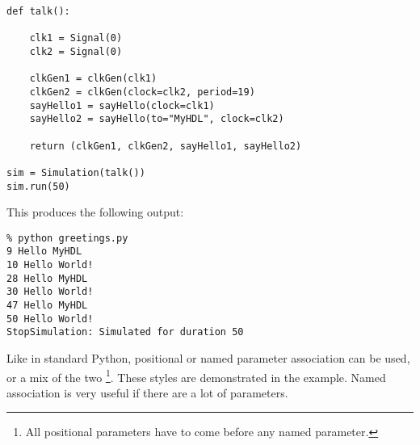 \begin{verbatim}
def talk():

    clk1 = Signal(0)
    clk2 = Signal(0)
    
    clkGen1 = clkGen(clk1)
    clkGen2 = clkGen(clock=clk2, period=19)
    sayHello1 = sayHello(clock=clk1)
    sayHello2 = sayHello(to="MyHDL", clock=clk2)

    return (clkGen1, clkGen2, sayHello1, sayHello2) 

sim = Simulation(talk())
sim.run(50)

\end{verbatim}

This produces the following output:

\begin{verbatim}
% python greetings.py
9 Hello MyHDL
10 Hello World!
28 Hello MyHDL
30 Hello World!
47 Hello MyHDL
50 Hello World!
StopSimulation: Simulated for duration 50

\end{verbatim}

Like in standard Python, positional or named parameter association can
be used, or a mix of the two \footnote{All positional parameters have
to come before any named parameter.}. These styles are demonstrated in
the example. Named association is very useful if there are a lot of
parameters. 

